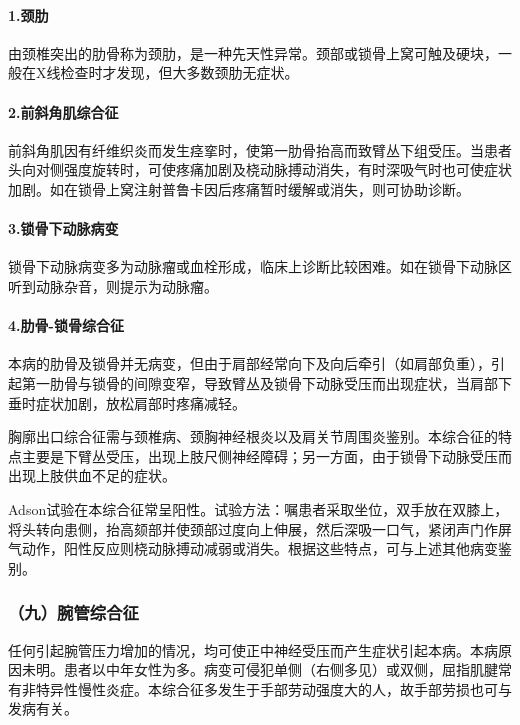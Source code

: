 \paragraph{1.颈肋}

由颈椎突出的肋骨称为颈肋，是一种先天性异常。颈部或锁骨上窝可触及硬块，一般在X线检查时才发现，但大多数颈肋无症状。

\paragraph{2.前斜角肌综合征}

前斜角肌因有纤维织炎而发生痉挛时，使第一肋骨抬高而致臂丛下组受压。当患者头向对侧强度旋转时，可使疼痛加剧及桡动脉搏动消失，有时深吸气时也可使症状加剧。如在锁骨上窝注射普鲁卡因后疼痛暂时缓解或消失，则可协助诊断。

\paragraph{3.锁骨下动脉病变}

锁骨下动脉病变多为动脉瘤或血栓形成，临床上诊断比较困难。如在锁骨下动脉区听到动脉杂音，则提示为动脉瘤。

\paragraph{4.肋骨-锁骨综合征}

本病的肋骨及锁骨并无病变，但由于肩部经常向下及向后牵引（如肩部负重），引起第一肋骨与锁骨的间隙变窄，导致臂丛及锁骨下动脉受压而出现症状，当肩部下垂时症状加剧，放松肩部时疼痛减轻。

胸廓出口综合征需与颈椎病、颈胸神经根炎以及肩关节周围炎鉴别。本综合征的特点主要是下臂丛受压，出现上肢尺侧神经障碍；另一方面，由于锁骨下动脉受压而出现上肢供血不足的症状。

Adson试验在本综合征常呈阳性。试验方法：嘱患者采取坐位，双手放在双膝上，将头转向患侧，抬高颏部并使颈部过度向上伸展，然后深吸一口气，紧闭声门作屏气动作，阳性反应则桡动脉搏动减弱或消失。根据这些特点，可与上述其他病变鉴别。

\subsubsection{（九）腕管综合征}

任何引起腕管压力增加的情况，均可使正中神经受压而产生症状引起本病。本病原因未明。患者以中年女性为多。病变可侵犯单侧（右侧多见）或双侧，屈指肌腱常有非特异性慢性炎症。本综合征多发生于手部劳动强度大的人，故手部劳损也可与发病有关。

